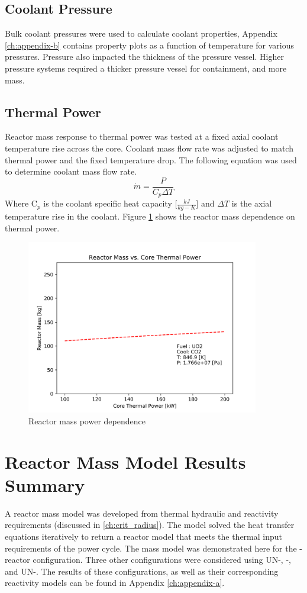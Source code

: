 \subsection{Coolant Pressure}
Bulk coolant pressures were used to calculate coolant properties, Appendix
\ref{ch:appendix-b} contains property plots as a function of temperature for
various pressures. Pressure also impacted the thickness of the pressure vessel.
Higher pressure systems required a thicker pressure vessel for containment, and more mass.

\subsection{Thermal Power}
Reactor mass response to thermal power was tested at a fixed axial coolant temperature
rise across the core. Coolant mass flow rate was adjusted to match thermal power
and the fixed temperature drop. The following equation was used to determine
coolant mass flow rate.
\begin{equation}
    \dot{m} = \frac{P}{C_p \Delta T}
\end{equation}
Where C$_p$ is the coolant specific heat capacity [$\frac{kJ}{kg-K}$] and
$\Delta T$ is the axial temperature rise in the coolant.
Figure \ref{fig:mass_vs_q_uo2_co2} shows the reactor mass dependence on thermal
power.

\begin{figure}[h]
    \centering
    \includegraphics[width=4in]{../images/mass_vs_q_uo2_co2.png}
\caption{Reactor mass power dependence}
\label{fig:mass_vs_q_uo2_co2}
\end{figure}

\section{Reactor Mass Model Results Summary}
A reactor mass model was developed from thermal hydraulic and reactivity
requirements (discussed in \ref{ch:crit_radius}). The model solved the heat
transfer equations iteratively to return a reactor model that meets the thermal
input requirements of the power cycle. The mass model was demonstrated here for
the \uox-\codiox  reactor configuration. Three other configurations were
considered using UN-\codiox, \uox-\water, and UN-\water. The results of these
configurations, as well as their corresponding reactivity models can be found in
Appendix \ref{ch:appendix-a}.
